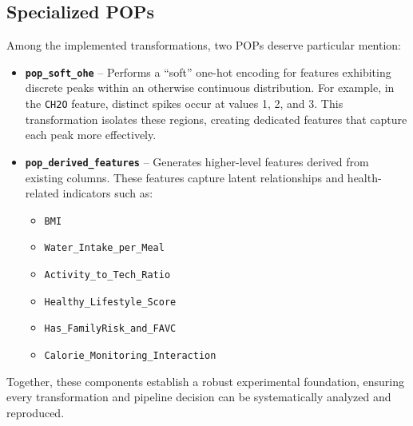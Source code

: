 \subsection{Specialized POPs}\label{subsec:specialized-pops}
Among the implemented transformations, two POPs deserve particular mention:
\begin{itemize}
    \item \textbf{\texttt{pop\_soft\_ohe}} – Performs a “soft” one-hot encoding for features exhibiting discrete peaks within an otherwise continuous distribution.
    For example, in the \texttt{CH2O} feature, distinct spikes occur at values 1, 2, and 3.
    This transformation isolates these regions, creating dedicated features that capture each peak more effectively.

    \item \textbf{\texttt{pop\_derived\_features}} – Generates higher-level features derived from existing columns.
    These features capture latent relationships and health-related indicators such as:
    \begin{itemize}
        \item \texttt{BMI}
        \item \texttt{Water\_Intake\_per\_Meal}
        \item \texttt{Activity\_to\_Tech\_Ratio}
        \item \texttt{Healthy\_Lifestyle\_Score}
        \item \texttt{Has\_FamilyRisk\_and\_FAVC}
        \item \texttt{Calorie\_Monitoring\_Interaction}
    \end{itemize}
\end{itemize}

Together, these components establish a robust experimental foundation, ensuring every transformation and pipeline decision can be systematically analyzed and reproduced.

